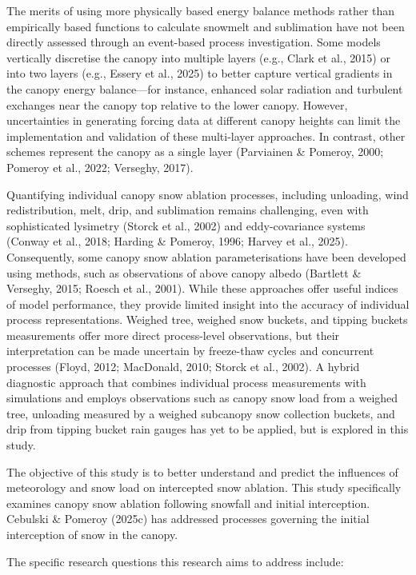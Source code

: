 \documentclass[
]{agujournal2019}
\begin{document}
The merits of using more physically based energy balance methods rather
than empirically based functions to calculate snowmelt and sublimation
have not been directly assessed through an event-based process
investigation. Some models vertically discretise the canopy into
multiple layers (e.g., Clark et al., 2015) or into two layers (e.g.,
Essery et al., 2025) to better capture vertical gradients in the canopy
energy balance---for instance, enhanced solar radiation and turbulent
exchanges near the canopy top relative to the lower canopy. However,
uncertainties in generating forcing data at different canopy heights can
limit the implementation and validation of these multi-layer approaches.
In contrast, other schemes represent the canopy as a single layer
(Parviainen \& Pomeroy, 2000; Pomeroy et al., 2022; Verseghy, 2017).

Quantifying individual canopy snow ablation processes, including
unloading, wind redistribution, melt, drip, and sublimation remains
challenging, even with sophisticated lysimetry (Storck et al., 2002) and
eddy-covariance systems (Conway et al., 2018; Harding \& Pomeroy, 1996;
Harvey et al., 2025). Consequently, some canopy snow ablation
parameterisations have been developed using methods, such as
observations of above canopy albedo (Bartlett \& Verseghy, 2015; Roesch
et al., 2001). While these approaches offer useful indices of model
performance, they provide limited insight into the accuracy of
individual process representations. Weighed tree, weighed snow buckets,
and tipping buckets measurements offer more direct process-level
observations, but their interpretation can be made uncertain by
freeze-thaw cycles and concurrent processes (Floyd, 2012; MacDonald,
2010; Storck et al., 2002). A hybrid diagnostic approach that combines
individual process measurements with simulations and employs
observations such as canopy snow load from a weighed tree, unloading
measured by a weighed subcanopy snow collection buckets, and drip from
tipping bucket rain gauges has yet to be applied, but is explored in
this study.

The objective of this study is to better understand and predict the
influences of meteorology and snow load on intercepted snow ablation.
This study specifically examines canopy snow ablation following snowfall
and initial interception. Cebulski \& Pomeroy (2025c) has addressed
processes governing the initial interception of snow in the canopy.

The specific research questions this research aims to address include:
\end{document}
